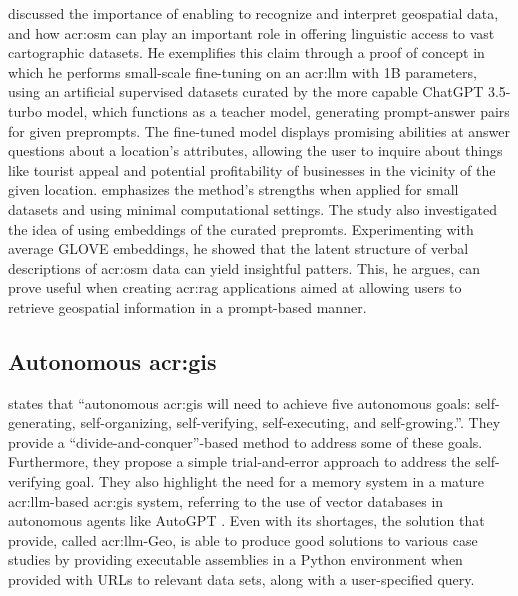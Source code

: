 \cite{unluChatmapLargeLanguage2023} discussed the importance of enabling  to recognize and interpret geospatial data, and how \gls{acr:osm} can play an important role in offering  linguistic access to vast cartographic datasets. He exemplifies this claim through a proof of concept in which he performs small-scale fine-tuning on an \acrshort{acr:llm} with 1B parameters, using an artificial supervised datasets curated by the more capable ChatGPT 3.5-turbo model, which functions as a teacher model, generating prompt-answer pairs for given preprompts. The fine-tuned model displays promising abilities at answer questions about a location's attributes, allowing the user to inquire about things like tourist appeal and potential profitability of businesses in the vicinity of the given location. \citeauthor{unluChatmapLargeLanguage2023} emphasizes the method's strengths when applied for small datasets and using minimal computational settings. The study also investigated the idea of using embeddings of the curated prepromts. Experimenting with average GLOVE embeddings, he showed that the latent structure of verbal descriptions of \gls{acr:osm} data can yield insightful patters. This, he argues, can prove useful when creating \acrfull{acr:rag} applications aimed at allowing users to retrieve geospatial information in a prompt-based manner.

\subsection[Autonomous GIS]{Autonomous \acrshort{acr:gis}}

\cite{liAutonomousGISNextgeneration2023} states that \enquote{autonomous \acrshort{acr:gis} will need to achieve five autonomous goals: self-generating, self-organizing, self-verifying, self-executing, and self-growing.}. They provide a \enquote{divide-and-conquer}-based method to address some of these goals. Furthermore, they propose a simple trial-and-error approach to address the self-verifying goal. They also highlight the need for a memory system in a mature \acrshort{acr:llm}-based \acrshort{acr:gis} system, referring to the use of vector databases in autonomous agents like AutoGPT \citep{richardAutoGPTHeartOpensource2023}. Even with its shortages, the solution that \cite{liAutonomousGISNextgeneration2023} provide, called \acrshort{acr:llm}-Geo, is able to produce good solutions to various case studies by providing executable assemblies in a Python environment when provided with URLs to relevant data sets, along with a user-specified query.

